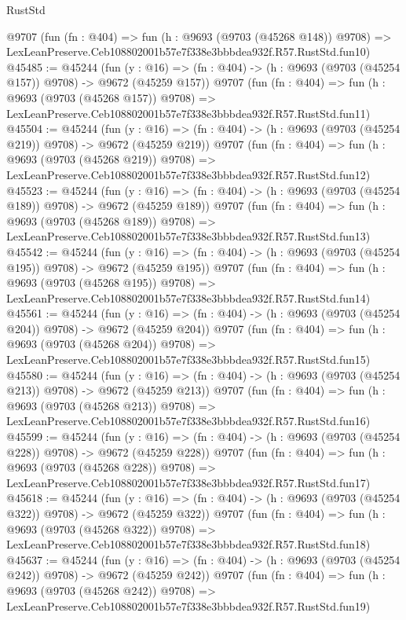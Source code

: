 \begin{lexlean}{RustStd}
\begin{coremodule}
    @9707
    (fun (fn : @404) =>
    fun (h : @9693 (@9703 (@45268 @148)) @9708) =>
    LexLeanPreserve.Ceb108802001b57e7f338e3bbbdea932f.R57.RustStd.fun10)
@45485 := @45244
    (fun (y : @16) => (fn : @404) -> (h : @9693 (@9703 (@45254 @157)) @9708) -> @9672 (@45259 @157))
    @9707
    (fun (fn : @404) =>
    fun (h : @9693 (@9703 (@45268 @157)) @9708) =>
    LexLeanPreserve.Ceb108802001b57e7f338e3bbbdea932f.R57.RustStd.fun11)
@45504 := @45244
    (fun (y : @16) => (fn : @404) -> (h : @9693 (@9703 (@45254 @219)) @9708) -> @9672 (@45259 @219))
    @9707
    (fun (fn : @404) =>
    fun (h : @9693 (@9703 (@45268 @219)) @9708) =>
    LexLeanPreserve.Ceb108802001b57e7f338e3bbbdea932f.R57.RustStd.fun12)
@45523 := @45244
    (fun (y : @16) => (fn : @404) -> (h : @9693 (@9703 (@45254 @189)) @9708) -> @9672 (@45259 @189))
    @9707
    (fun (fn : @404) =>
    fun (h : @9693 (@9703 (@45268 @189)) @9708) =>
    LexLeanPreserve.Ceb108802001b57e7f338e3bbbdea932f.R57.RustStd.fun13)
@45542 := @45244
    (fun (y : @16) => (fn : @404) -> (h : @9693 (@9703 (@45254 @195)) @9708) -> @9672 (@45259 @195))
    @9707
    (fun (fn : @404) =>
    fun (h : @9693 (@9703 (@45268 @195)) @9708) =>
    LexLeanPreserve.Ceb108802001b57e7f338e3bbbdea932f.R57.RustStd.fun14)
@45561 := @45244
    (fun (y : @16) => (fn : @404) -> (h : @9693 (@9703 (@45254 @204)) @9708) -> @9672 (@45259 @204))
    @9707
    (fun (fn : @404) =>
    fun (h : @9693 (@9703 (@45268 @204)) @9708) =>
    LexLeanPreserve.Ceb108802001b57e7f338e3bbbdea932f.R57.RustStd.fun15)
@45580 := @45244
    (fun (y : @16) => (fn : @404) -> (h : @9693 (@9703 (@45254 @213)) @9708) -> @9672 (@45259 @213))
    @9707
    (fun (fn : @404) =>
    fun (h : @9693 (@9703 (@45268 @213)) @9708) =>
    LexLeanPreserve.Ceb108802001b57e7f338e3bbbdea932f.R57.RustStd.fun16)
@45599 := @45244
    (fun (y : @16) => (fn : @404) -> (h : @9693 (@9703 (@45254 @228)) @9708) -> @9672 (@45259 @228))
    @9707
    (fun (fn : @404) =>
    fun (h : @9693 (@9703 (@45268 @228)) @9708) =>
    LexLeanPreserve.Ceb108802001b57e7f338e3bbbdea932f.R57.RustStd.fun17)
@45618 := @45244
    (fun (y : @16) => (fn : @404) -> (h : @9693 (@9703 (@45254 @322)) @9708) -> @9672 (@45259 @322))
    @9707
    (fun (fn : @404) =>
    fun (h : @9693 (@9703 (@45268 @322)) @9708) =>
    LexLeanPreserve.Ceb108802001b57e7f338e3bbbdea932f.R57.RustStd.fun18)
@45637 := @45244
    (fun (y : @16) => (fn : @404) -> (h : @9693 (@9703 (@45254 @242)) @9708) -> @9672 (@45259 @242))
    @9707
    (fun (fn : @404) =>
    fun (h : @9693 (@9703 (@45268 @242)) @9708) =>
    LexLeanPreserve.Ceb108802001b57e7f338e3bbbdea932f.R57.RustStd.fun19)

\end{coremodule}
\end{lexlean}
